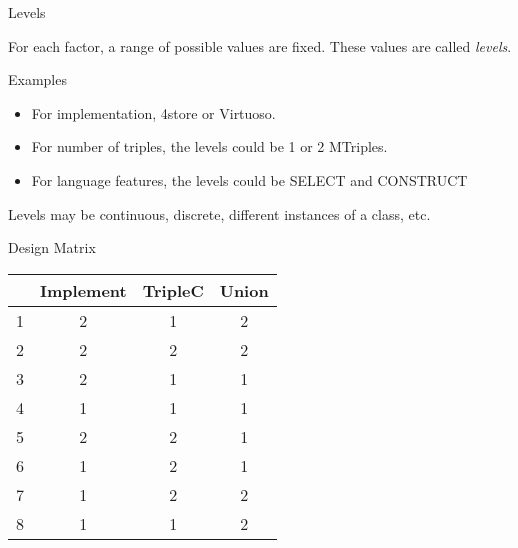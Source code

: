 \documentclass[english,usenames,dvipsnames,aspectratio=169]{beamer}
\begin{document}
\begin{frame}{Levels}

\Large
For each factor, a range of possible values are fixed. These values
are called \emph{levels}.
\normalsize

\begin{block}{Examples}
  \begin{itemize}
  \item For implementation, 4store or Virtuoso.
  \item For number of triples, the levels could be 1 or 2 MTriples.
  \item For language features, the levels could be \textsf{SELECT} and \textsf{CONSTRUCT}
  \end{itemize}
\end{block}
Levels may be continuous, discrete, different instances of a
class, etc.

\end{frame}

\begin{frame}{Design Matrix}

\begin{table}[ht]
\begin{center}
\begin{tabular}{r|ccc}
  \hline
 & Implement & TripleC & Union \\ 
  \hline
1 & 2 & 1 & 2 \\ 
  2 & 2 & 2 & 2 \\ 
  3 & 2 & 1 & 1 \\ 
  4 & 1 & 1 & 1 \\ 
  5 & 2 & 2 & 1 \\ 
  6 & 1 & 2 & 1 \\ 
  7 & 1 & 2 & 2 \\ 
  8 & 1 & 1 & 2 \\ 
   \hline
\end{tabular}
\end{center}
\end{table}


\end{frame}
\end{document}
